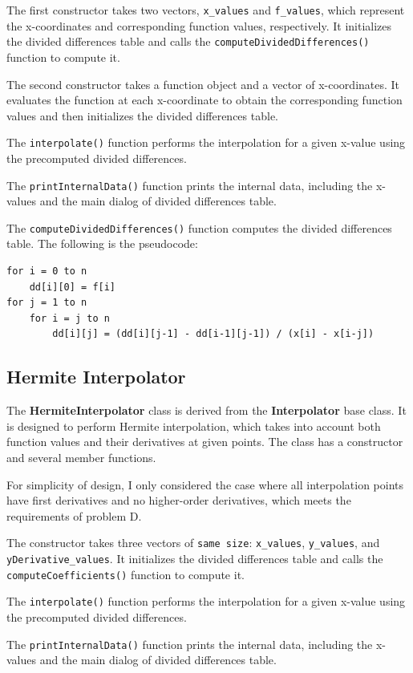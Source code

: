 \documentclass[a4paper]{article}
\begin{document}
The first constructor takes two vectors, \texttt{x\_values} and \texttt{f\_values}, which represent the x-coordinates and corresponding function values, respectively. It initializes the divided differences table and calls the \texttt{computeDividedDifferences()} function to compute it.

The second constructor takes a function object and a vector of x-coordinates. It evaluates the function at each x-coordinate to obtain the corresponding function values and then initializes the divided differences table.

The \texttt{interpolate()} function performs the interpolation for a given x-value using the precomputed divided differences.

The \texttt{printInternalData()} function prints the internal data, including the x-values and the main dialog of divided differences table.

The \texttt{computeDividedDifferences()} function computes the divided differences table. The following is the pseudocode:
\begin{lstlisting}
for i = 0 to n
    dd[i][0] = f[i]
for j = 1 to n
    for i = j to n
        dd[i][j] = (dd[i][j-1] - dd[i-1][j-1]) / (x[i] - x[i-j])
\end{lstlisting}

\subsection{Hermite Interpolator}
The \textbf{HermiteInterpolator} class is derived from the \textbf{Interpolator} base class. It is designed to perform Hermite interpolation, which takes into account both function values and their derivatives at given points. The class has a constructor and several member functions.

For simplicity of design, I only considered the case where all interpolation points have first derivatives and no higher-order derivatives, which meets the requirements of problem D.

The constructor takes three vectors of \texttt{same size}: \texttt{x\_values}, \texttt{y\_values}, and \texttt{yDerivative\_values}. It initializes the divided differences table and calls the \texttt{computeCoefficients()} function to compute it.

The \texttt{interpolate()} function performs the interpolation for a given x-value using the precomputed divided differences.

The \texttt{printInternalData()} function prints the internal data, including the x-values and the main dialog of divided differences table.
\end{document}
